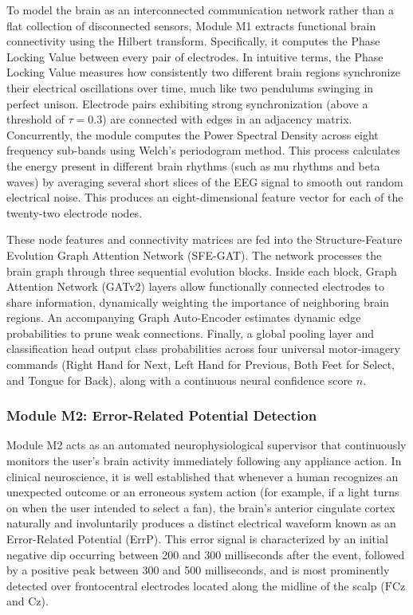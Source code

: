 \documentclass[12pt,a4paper]{report}
\begin{document}
To model the brain as an interconnected communication network rather than a flat collection of disconnected sensors, Module M1 extracts functional brain connectivity using the Hilbert transform. Specifically, it computes the Phase Locking Value between every pair of electrodes. In intuitive terms, the Phase Locking Value measures how consistently two different brain regions synchronize their electrical oscillations over time, much like two pendulums swinging in perfect unison. Electrode pairs exhibiting strong synchronization (above a threshold of $\tau = 0.3$) are connected with edges in an adjacency matrix. Concurrently, the module computes the Power Spectral Density across eight frequency sub-bands using Welch's periodogram method. This process calculates the energy present in different brain rhythms (such as mu rhythms and beta waves) by averaging several short slices of the EEG signal to smooth out random electrical noise. This produces an eight-dimensional feature vector for each of the twenty-two electrode nodes.

These node features and connectivity matrices are fed into the Structure-Feature Evolution Graph Attention Network (SFE-GAT). The network processes the brain graph through three sequential evolution blocks. Inside each block, Graph Attention Network (GATv2) layers allow functionally connected electrodes to share information, dynamically weighting the importance of neighboring brain regions. An accompanying Graph Auto-Encoder estimates dynamic edge probabilities to prune weak connections. Finally, a global pooling layer and classification head output class probabilities across four universal motor-imagery commands (Right Hand for Next, Left Hand for Previous, Both Feet for Select, and Tongue for Back), along with a continuous neural confidence score $n$.

\subsubsection{Module M2: Error-Related Potential Detection}
Module M2 acts as an automated neurophysiological supervisor that continuously monitors the user's brain activity immediately following any appliance action. In clinical neuroscience, it is well established that whenever a human recognizes an unexpected outcome or an erroneous system action (for example, if a light turns on when the user intended to select a fan), the brain's anterior cingulate cortex naturally and involuntarily produces a distinct electrical waveform known as an Error-Related Potential (ErrP). This error signal is characterized by an initial negative dip occurring between 200 and 300 milliseconds after the event, followed by a positive peak between 300 and 500 milliseconds, and is most prominently detected over frontocentral electrodes located along the midline of the scalp ($\mathrm{FCz}$ and $\mathrm{Cz}$).
\end{document}
